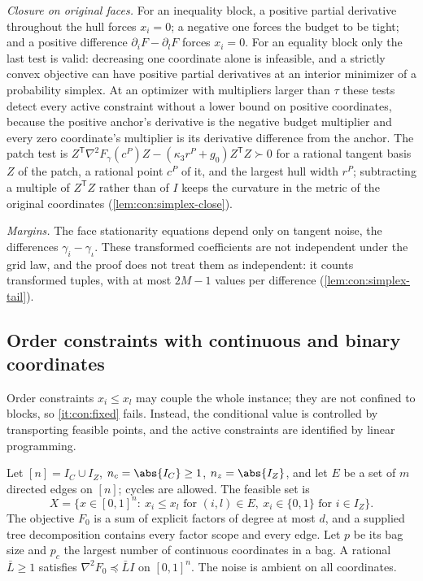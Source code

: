 \emph{Closure on original faces.} For an inequality block, a positive partial
derivative throughout the hull forces $x_i=0$; a negative one forces the
budget to be tight; and a positive difference $\partial_iF-\partial_lF$
forces $x_i=0$. For an equality block only the last test is valid: decreasing
one coordinate alone is infeasible, and a strictly convex objective can have
positive partial derivatives at an interior minimizer of a probability
simplex. At an optimizer with multipliers larger than $\tau$ these tests
detect every active constraint without a lower bound on positive
coordinates, because the positive anchor's derivative is the negative budget
multiplier and every zero coordinate's multiplier is its derivative
difference from the anchor. The patch test is
$Z^{\mathsf T}\nabla^2F_\gamma(c^P)Z-(\kappa_3r^P+g_0)Z^{\mathsf T}Z\succ0$ for a
rational tangent basis $Z$ of the patch, a rational point $c^P$ of it, and the
largest hull width $r^P$; subtracting a multiple of $Z^{\mathsf T}Z$ rather
than of $I$ keeps the curvature in the metric of the original coordinates
(\cref{lem:con:simplex-close}).

\emph{Margins.} The face stationarity equations depend only on tangent noise,
the differences $\gamma_i-\gamma_\iota$. These transformed coefficients are
not independent under the grid law, and the proof does not treat them as
independent: it counts transformed tuples, with at most $2M-1$ values per
difference (\cref{lem:con:simplex-tail}).

\subsection{Order constraints with continuous and binary coordinates}\label{sec:con:order}

Order constraints $x_i\le x_l$ may couple the whole instance; they are not
confined to blocks, so \ref{it:con:fixed} fails. Instead, the conditional
value is controlled by transporting feasible points, and the active
constraints are identified by linear programming.

\begin{definition}\label{def:con:order}
Let $[n]=I_C\cup I_Z$, $n_c=\abs{I_C}\ge1$, $n_z=\abs{I_Z}$, and let $E$ be a
set of $m$ directed edges on $[n]$; cycles are allowed. The feasible set is
\[
 X=\{x\in[0,1]^n:\ x_i\le x_l\text{ for }(i,l)\in E,\ x_i\in\{0,1\}
 \text{ for }i\in I_Z\}.
\]
The objective $F_0$ is a sum of explicit factors of degree at most $d$, and
a supplied tree decomposition contains every factor scope and every edge.
Let $p$ be its bag size and $p_c$ the largest number of continuous
coordinates in a bag. A rational $\bar L\ge1$ satisfies
$\nabla^2F_0\preceq\bar LI$ on $[0,1]^n$. The noise is ambient on all
coordinates.
\end{definition}

